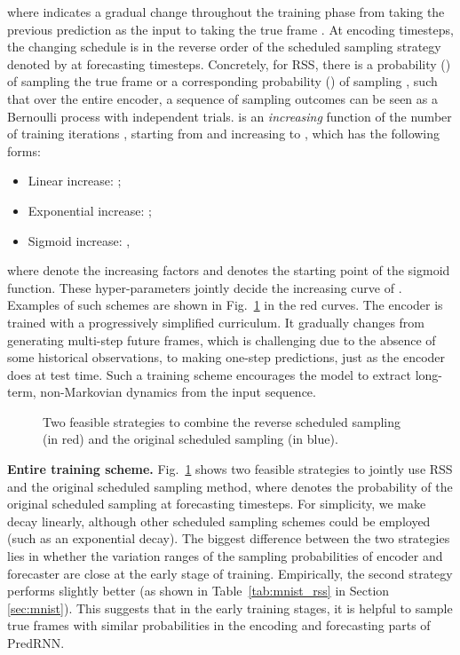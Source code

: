 \documentclass[10pt,journal,compsoc]{IEEEtran}
\newcommand{\tab}[1]{Table~\ref{#1}}
\newcommand{\fig}[1]{Fig.~\ref{#1}}
\newcommand{\myparagraph}[1]{\vspace{5pt} \noindent \textbf{#1.}}
\begin{document}
where  indicates a gradual change throughout the training phase from taking the previous prediction   as the input to taking the true frame .
At encoding timesteps, the changing schedule is in the reverse order of the scheduled sampling strategy denoted by  at forecasting timesteps.
Concretely, for RSS, there is a probability () of sampling the true frame  or a corresponding probability () of sampling , such that over the entire encoder, a sequence of sampling outcomes can be seen as a Bernoulli process with  independent trials. 
 is an \textit{increasing} function of the number of training iterations , starting from  and increasing to , which has the following forms: 
\begin{itemize}[leftmargin=*]
\item Linear increase: ;
\item Exponential increase: ;
\item Sigmoid increase: ,
\end{itemize}
where  denote the increasing factors and  denotes the starting point of the sigmoid function. These hyper-parameters jointly decide the increasing curve of .
Examples of such schemes are shown in \fig{fig:rss_schemes} in the red curves. 
The encoder is trained with a progressively simplified curriculum. It gradually changes from generating multi-step future frames, which is challenging due to the absence of some historical observations, to making one-step predictions, just as the encoder does at test time. 
Such a training scheme encourages the model to extract long-term, non-Markovian dynamics from the input sequence.




\begin{figure}[t]
\centering
\vspace{-5pt}
\vskip -0.15in
\caption{Two feasible strategies to combine the reverse scheduled sampling (in red) and the original scheduled sampling (in blue).
}
\label{fig:rss_schemes}
\vspace{-10pt}
\end{figure}


\myparagraph{Entire training scheme}
\fig{fig:rss_schemes} shows two feasible strategies to jointly use RSS and the original scheduled sampling method, where  denotes the probability of the original scheduled sampling at forecasting timesteps.
For simplicity, we make  decay linearly, although other scheduled sampling schemes could be employed (such as an exponential decay).
The biggest difference between the two strategies lies in whether the variation ranges of the sampling probabilities of encoder and forecaster are close at the early stage of training.
Empirically, the second strategy performs slightly better (as shown in \tab{tab:mnist_rss} in Section \ref{sec:mnist}).
This suggests that in the early training stages, it is helpful to sample true frames with similar probabilities in the encoding and forecasting parts of PredRNN.
\end{document}
